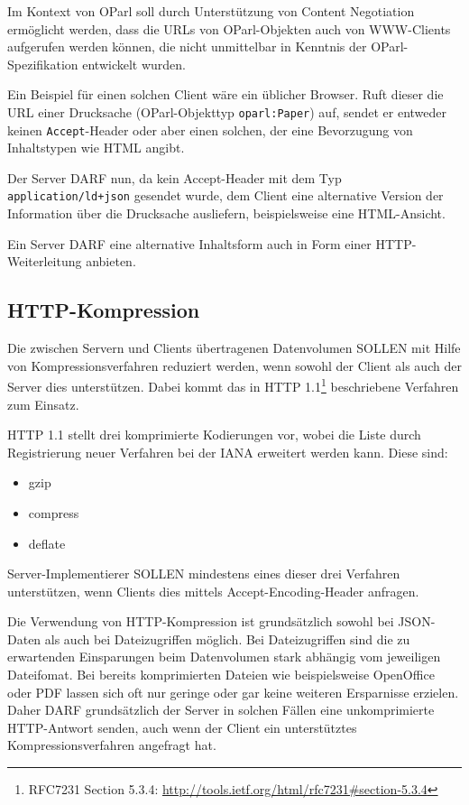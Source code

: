 \documentclass[,a4paper]{article}
\begin{document}
Im Kontext von OParl soll durch Unterstützung von Content Negotiation
ermöglicht werden, dass die URLs von OParl-Objekten auch von WWW-Clients
aufgerufen werden können, die nicht unmittelbar in Kenntnis der
OParl-Spezifikation entwickelt wurden.

Ein Beispiel für einen solchen Client wäre ein üblicher Browser. Ruft
dieser die URL einer Drucksache (OParl-Objekttyp \texttt{oparl:Paper})
auf, sendet er entweder keinen \texttt{Accept}-Header oder aber einen
solchen, der eine Bevorzugung von Inhaltstypen wie HTML angibt.

Der Server DARF nun, da kein Accept-Header mit dem Typ
\texttt{application/ld+json} gesendet wurde, dem Client eine alternative
Version der Information über die Drucksache ausliefern, beispielsweise
eine HTML-Ansicht.

Ein Server DARF eine alternative Inhaltsform auch in Form einer
HTTP-Weiterleitung anbieten.

\subsection{HTTP-Kompression}\label{http-kompression}

Die zwischen Servern und Clients übertragenen Datenvolumen SOLLEN mit
Hilfe von Kompressionsverfahren reduziert werden, wenn sowohl der Client
als auch der Server dies unterstützen. Dabei kommt das in HTTP
1.1\footnote{RFC7231 Section 5.3.4:
  \url{http://tools.ietf.org/html/rfc7231\#section-5.3.4}} beschriebene
Verfahren zum Einsatz.

HTTP 1.1 stellt drei komprimierte Kodierungen vor, wobei die Liste durch
Registrierung neuer Verfahren bei der IANA erweitert werden kann. Diese
sind:

\begin{itemize}
\itemsep1pt\parskip0pt
\item
  gzip
\item
  compress
\item
  deflate
\end{itemize}

Server-Implementierer SOLLEN mindestens eines dieser drei Verfahren
unterstützen, wenn Clients dies mittels Accept-Encoding-Header anfragen.

Die Verwendung von HTTP-Kompression ist grundsätzlich sowohl bei
JSON-Daten als auch bei Dateizugriffen möglich. Bei Dateizugriffen sind
die zu erwartenden Einsparungen beim Datenvolumen stark abhängig vom
jeweiligen Dateifomat. Bei bereits komprimierten Dateien wie
beispielsweise OpenOffice oder PDF lassen sich oft nur geringe oder gar
keine weiteren Ersparnisse erzielen. Daher DARF grundsätzlich der Server
in solchen Fällen eine unkomprimierte HTTP-Antwort senden, auch wenn der
Client ein unterstütztes Kompressionsverfahren angefragt hat.
\end{document}
